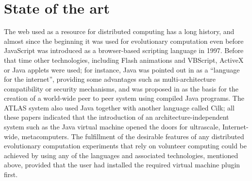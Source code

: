 \documentclass[journal,onecolumn]{IEEEtran}
\begin{document}
\section{State of the art}
\label{sec:soa}

The web used as a resource for distributed computing has a
long history, and almost since the beginning it was used for
evolutionary computation even before JavaScript was
introduced as a browser-based scripting language in 1997. Before that
time other technologies,
 including Flash animations and VBScript, ActiveX or Java applets were
used; for instance, Java was pointed out in \cite{soares1998get} as a
``language for the internet'', providing some advantages such as multi-architecture compatibility or
security mechanisms, and was proposed in \cite{chandy1996world} as the
basis for the creation of a world-wide peer to peer system using compiled Java
programs. The ATLAS system
\cite{Baldeschwieler:1996:TIG:504450.504482} also used Java together
with another language called Cilk; all these papers indicated that
the introduction of an architecture-independent system such as the
Java virtual machine opened the doors for ultrascale, Internet-wide,
metacomputers. 
The fulfillment of the desirable features of any distributed evolutionary 
computation experiments that rely on volunteer computing \cite{2016arXiv160101607M} could be achieved by using any of the
languages and associated technologies, mentioned above, provided that the user had
installed the required virtual machine plugin first. 
\end{document}
